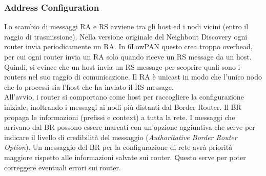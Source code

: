 \documentclass{article}
\begin{document}
\subsubsection{Address Configuration}
Lo scambio di messaggi RA e RS avviene tra gli host ed i nodi vicini (entro il raggio di trasmissione). Nella versione originale del Neighbout Discovery ogni router invia periodicamente un RA. In 6LowPAN questo crea troppo overhead,
per cui ogni router invia un RA solo quando riceve un RS message da un host. 
Quindi, si evince che un host invia un RS message per scoprire quali sono i routers nel suo raggio di comunicazione.
Il RA è unicast in modo che l'unico nodo che lo processi sia l'host che ha inviato il RS message. \\
All'avvio, i router si comportano come host per raccogliere la configurazione iniziale, inoltrando i messaggi ai nodi più distanti dal Border Router. Il BR propaga le informazioni (prefissi e context) a tutta la rete. I messaggi che arrivano dal BR possono essere marcati con un'opzione aggiuntiva che serve per indicare il livello di credibilità del messaggio (\textit{Authoritative Border Router Option}). Un messaggio del BR per la configurazione di rete avrà priorità maggiore rispetto alle informazioni salvate sui router. Questo serve per poter correggere eventuali errori sui router.
\end{document}
